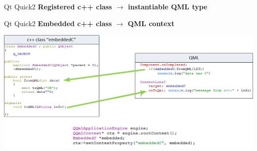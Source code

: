 \documentclass[11pt]{beamer}
\begin{document}
\begin{frame}[t]{Qt Quick2}
	\textbf{Registered c++ class $\rightarrow$ instantiable QML type}
	\begin{center}
	\end{center}
\end{frame}

\begin{frame}[t]{Qt Quick2}
	\textbf{Embedded c++ class  $\rightarrow$ QML context}
	\begin{center}
		\includegraphics[width=.90\linewidth]{pictures/qml3}
	\end{center}
\end{frame}
\end{document}
